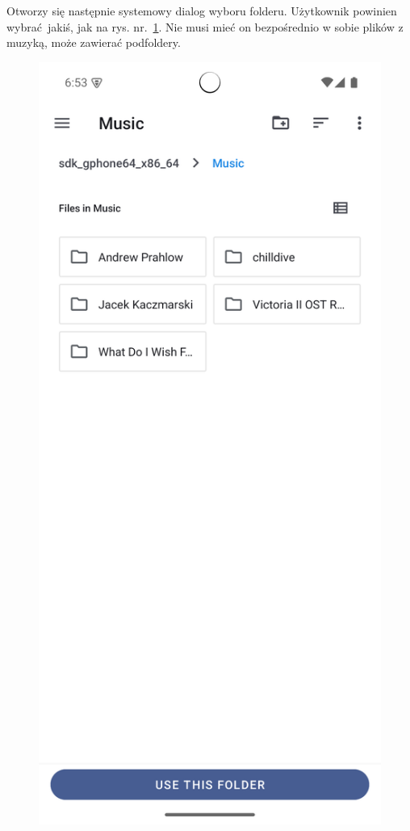 Otworzy się następnie systemowy dialog wyboru folderu. Użytkownik powinien wybrać jakiś, jak na rys. nr.~\ref{fig:tutorial_folder_selected}. Nie musi mieć on bezpośrednio w sobie plików z muzyką, może zawierać podfoldery.

\begin{figure}[H]
	\centering
	\includegraphics[width=1\textwidth]{images/tutorial_folder_selected.png}
	\caption{}
	\label{fig:tutorial_folder_selected}
\end{figure}

